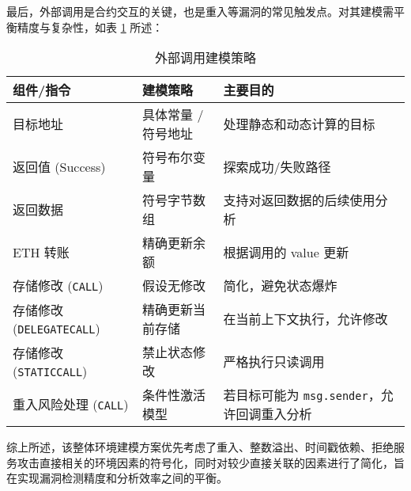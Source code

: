 \documentclass[print, master, vlined, timesmath]{DissertUESTC}
\begin{document}
最后，外部调用是合约交互的关键，也是重入等漏洞的常见触发点。对其建模需平衡精度与复杂性，如表 \ref{tab:external_call_modeling} 所述：

\begin{table}[H] %
    \centering
    \caption{外部调用建模策略}
    \small %
    \begin{tabularx}{\linewidth}{lll}
        \toprule
        \textbf{组件/指令} & \textbf{建模策略} & \textbf{主要目的} \\
        \midrule
        目标地址 & 具体常量 / 符号地址 & 处理静态和动态计算的目标 \\
        返回值 (Success) & 符号布尔变量 & 探索成功/失败路径\\
        返回数据 & 符号字节数组 & 支持对返回数据的后续使用分析 \\
        ETH 转账 & 精确更新余额 & 根据调用的 value 更新 \\
        存储修改 (\texttt{CALL}) & 假设无修改 & 简化，避免状态爆炸 \\
        存储修改 (\texttt{DELEGATECALL}) & 精确更新当前存储 & 在当前上下文执行，允许修改 \\
        存储修改 (\texttt{STATICCALL}) & 禁止状态修改 & 严格执行只读调用 \\
        重入风险处理 (\texttt{CALL}) & 条件性激活模型 & 若目标可能为 \texttt{msg.sender}，允许回调重入分析 \\
        \bottomrule
    \end{tabularx}
    \label{tab:external_call_modeling}
\end{table}

综上所述，该整体环境建模方案优先考虑了重入、整数溢出、时间戳依赖、拒绝服务攻击直接相关的环境因素的符号化，同时对较少直接关联的因素进行了简化，旨在实现漏洞检测精度和分析效率之间的平衡。





\end{document}
